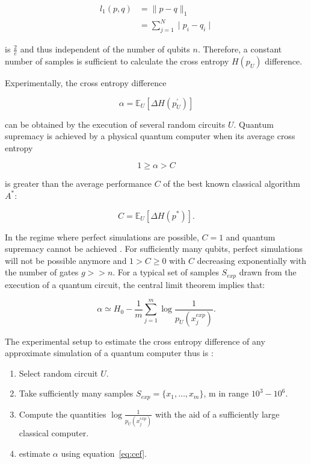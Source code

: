 \begin{align}
  l_1(p,q) &= \| p-q\|_1 \\
           &= \sum_{j=1}^N \mid p_i - q_i \mid
\end{align}

is $\frac{2}{e}$ and thus independent of the number of qubits $n$. Therefore, a
constant number of samples is sufficient to calculate the cross entropy $H(p_U)$
difference.

Experimentally, the cross entropy difference

\begin{equation}
  \alpha = \mathbb{E}_U[\Delta H(p^{\prime}_U)]
\end{equation}

can be obtained by the execution of several random circuits $U$. Quantum
supremacy is achieved by a physical quantum computer when its average cross
entropy

\begin{equation}
  1 \geq \alpha > C
\end{equation}

is greater than the average performance $C$ of the best known classical algorithm $A^*$:

\begin{equation}
  C = \mathbb{E}_U[\Delta H(p^*)] .
\end{equation}

In the regime where perfect simulations are possible, $C=1$ and quantum
supremacy cannot be achieved \cite{Boixo2018supremacy}. For sufficiently many qubits, perfect simulations
will not be possible anymore and $1 > C \geq 0$ with $C$ decreasing exponentially
with the number of gates $g>>n$. For a typical set of samples $S_{exp}$ drawn from the
execution of a quantum circuit, the central limit theorem implies that:

\begin{equation}
  \label{eq:cef}
  \alpha \simeq H_0 - \frac{1}{m} \sum_{j = 1}^m \log{\frac{1}{p_U(x_j^{exp})}}.
\end{equation}

The experimental setup to estimate the cross entropy difference of any
approximate simulation of a quantum computer thus is \cite{Boixo2018supremacy}:

\begin{enumerate}
\item Select random circuit $U$.
  \item Take sufficiently many samples $S_{exp} = \{x_1, \dots, x_m\}$, m in
    range $10^3-10^6$.
    \item Compute the quantities $\log{\frac{1}{p_U(x_j^{exp})}}$ with the aid
      of a sufficiently large classical computer.
      \item estimate $\alpha$ using equation~\ref{eq:cef}.
\end{enumerate}

